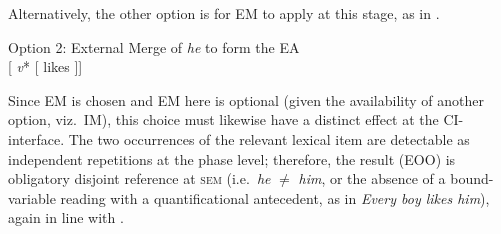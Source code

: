 \documentclass[output=paper]{langsci/langscibook}
\begin{document}
Alternatively, the other option is for \gls{EM} to apply at this stage, as in
.

\ea\label{ex:22.11}Option 2: External Merge of \emph{he} to
    form the \gls{EA}\\
    {}[\emph{}   \emph{v}* [ likes  ]]
    \vspace{1.5\baselineskip}
\z

Since \gls{EM} is chosen and \gls{EM} here is optional (given the availability
of another option, viz.\ \gls{IM}), this choice must likewise have a distinct
effect at the CI-interface. The two occurrences of the relevant lexical item
are detectable as independent repetitions at the phase level; therefore, the
result (\gls{EOO}) is obligatory disjoint reference at \textsc{sem} (i.e.\ \emph{he} ${\neq}$
\emph{him}, or the absence of a bound-variable reading with a quantificational
antecedent, as in \emph{Every boy likes him}), again in line with
.
\end{document}
